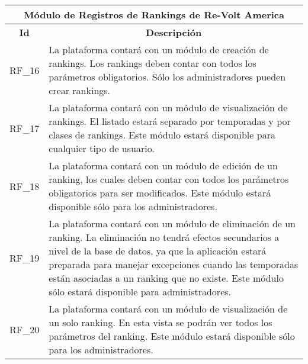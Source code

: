 \begin{center}
	\begin{tabular}{ | l | p{15cm} |}
		\hline
		\multicolumn{2}{|c|}{\textbf{Módulo de Registros de Rankings de Re-Volt America}} \\
		\hline
		\multicolumn{1}{|c|}{\textbf{Id}} & \multicolumn{1}{|c|}{\textbf{Descripción}} \\
		\hline
		RF\_16 & La plataforma contará con un módulo de creación de rankings. Los rankings deben contar con todos los parámetros obligatorios. Sólo los administradores pueden crear rankings. \\ \hline
		
		RF\_17 & La plataforma contará con un módulo de visualización de rankings. El listado estará separado por temporadas y por clases de rankings. Este módulo estará disponible para cualquier tipo de usuario. \\ \hline
		
		RF\_18 & La plataforma contará con un módulo de edición de un ranking, los cuales deben contar con todos los parámetros obligatorios para ser modificados. Este módulo estará disponible sólo para los administradores. \\ \hline
		
		RF\_19 & La plataforma contará con un módulo de eliminación de un ranking. La eliminación no tendrá efectos secundarios a nivel de la base de datos, ya que la aplicación estará preparada para manejar excepciones cuando las temporadas están asociadas a un ranking que no existe. Este módulo sólo estará disponible para administradores. \\ \hline
		
		RF\_20 & La plataforma contará con un módulo de visualización de un solo ranking. En esta vista se podrán ver todos los parámetros del ranking. Este módulo estará disponible sólo para los administradores. \\ \hline
	\end{tabular}
\end{center}


